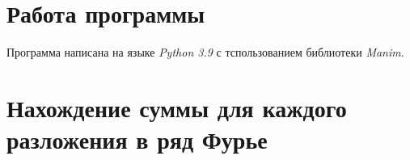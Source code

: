\documentclass[a5paper, 10pt]{article}
\theoremstyle{definition}
\theoremstyle{plain}
\theoremstyle{remark}
\begin{document}
\newpage

\section{Работа программы}
Программа написана на языке \textit{Python 3.9} с тспользованием библиотеки \textit{Manim}.


\newpage

\section{Нахождение суммы для каждого разложения в ряд Фурье}
\end{document}
